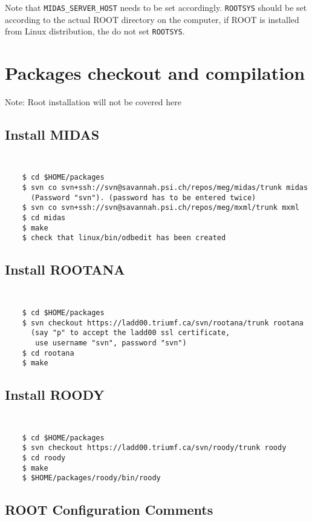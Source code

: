 \documentclass[12pt, letterpaper]{article}
\begin{document}
Note that {\tt MIDAS\_SERVER\_HOST} needs to be set accordingly. \texttt{ROOTSYS} should be set according to the actual ROOT directory on the computer, if ROOT is installed from Linux distribution, the do not set \texttt{ROOTSYS}.



\section{Packages checkout and compilation} 

Note: Root installation will not be covered here

\subsection{Install MIDAS}

{\tt 
\begin{lstlisting}
    $ cd $HOME/packages
    $ svn co svn+ssh://svn@savannah.psi.ch/repos/meg/midas/trunk midas 
      (Password "svn"). (password has to be entered twice)
    $ svn co svn+ssh://svn@savannah.psi.ch/repos/meg/mxml/trunk mxml
    $ cd midas
    $ make
    $ check that linux/bin/odbedit has been created
\end{lstlisting}
}


\subsection{Install ROOTANA}
 
{\tt 
\begin{lstlisting}    
    $ cd $HOME/packages
    $ svn checkout https://ladd00.triumf.ca/svn/rootana/trunk rootana 
      (say "p" to accept the ladd00 ssl certificate, 
	   use username "svn", password "svn")
    $ cd rootana
    $ make
\end{lstlisting}    
}


\subsection{Install ROODY}

{\tt 
\begin{lstlisting}
    $ cd $HOME/packages
    $ svn checkout https://ladd00.triumf.ca/svn/roody/trunk roody
    $ cd roody
    $ make
    $ $HOME/packages/roody/bin/roody
\end{lstlisting}    
}


\subsection{ROOT Configuration Comments}
\end{document}
